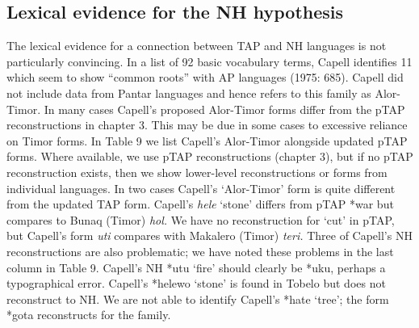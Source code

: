 \subsection{Lexical evidence for the NH hypothesis}
The lexical evidence for a connection between TAP and NH languages is not particularly convincing. In a list of 92 basic vocabulary terms, Capell identifies 11 which seem to show ``common roots'' with AP languages (1975: 685). Capell did not include data from Pantar languages and hence refers to this family as Alor-Timor. In many cases Capell's proposed Alor-Timor forms differ from the pTAP reconstructions in chapter 3. This may be due in some cases to excessive reliance on Timor forms. In Table 9 we list Capell's Alor-Timor alongside updated pTAP forms. Where available, we use pTAP reconstructions (chapter 3), but if no pTAP reconstruction exists, then we show lower-level reconstructions or forms from individual languages. In two cases Capell's `Alor-Timor' form is quite different from the updated TAP form. Capell's \textit{hele} `stone' differs from pTAP *war but compares to Bunaq (Timor) \textit{hol. }We have no reconstruction for `cut' in pTAP, but Capell's form \textit{uti }compares with Makalero (Timor)
 \textit{teri. }Three of Capell's NH reconstructions are also problematic; we have noted these problems in the last column in Table 9. Capell's NH *utu `fire' should clearly be *uku, perhaps a typographical error. Capell's *helewo `stone' is found in Tobelo but does not reconstruct to NH. We are not able to identify Capell's *hate `tree'; the form *gota reconstructs for the family.




